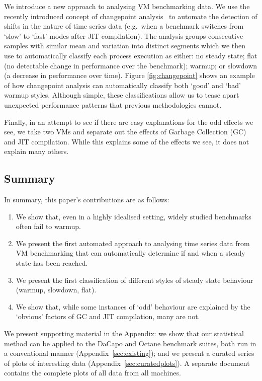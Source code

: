 \documentclass[acmlarge]{acmart}\settopmatter{printfolios=true}
\begin{document}
We introduce a new approach to analysing VM benchmarking data. We use the
recently introduced concept of changepoint analysis~\cite{eckley11analysis} to automate the detection
of shifts in the nature of time series data (e.g.~when a benchmark switches
from `slow' to `fast' modes after JIT compilation). The analysis groups consecutive samples
with similar mean and variation into distinct segments
which we then use to automatically classify each process execution as either:
no steady state; flat (no detectable change in performance
over the benchmark); warmup; or slowdown (a decrease in performance over time).
Figure \ref{fig:changepoint} shows an example of how changepoint analysis
can automatically classify both `good' and `bad' warmup styles.
Although simple, these classifications allow us to tease apart
unexpected performance patterns that previous methodologies cannot.

Finally, in an attempt to see if there are easy explanations for the odd
effects we see, we take two VMs and separate out the
effects of Garbage Collection (GC) and JIT compilation. While this explains
some of the effects we see, it does not explain many others.


\subsection{Summary}

In summary, this paper's contributions are as follows:
\begin{enumerate}
    \item We show that, even in a highly idealised setting, widely studied benchmarks
often fail to warmup.
    \item We present the first automated approach to analysing time series
data from VM benchmarking that can automatically determine if and when a steady
state has been reached.
    \item We present the first classification of different styles of
steady state behaviour (warmup, slowdown, flat).
    \item We show that, while some instances of `odd' behaviour are explained by
the `obvious' factors of GC and JIT compilation, many are not.
\end{enumerate}

We present supporting material in the Appendix: we show that our
statistical method can be applied to the DaCapo and Octane benchmark suites,
both run in a conventional manner (Appendix~\ref{sec:existing}); and we present a curated
series of plots of interesting data (Appendix~\ref{sec:curatedplots}). A
separate document contains the complete plots of all data from all machines.
\end{document}
